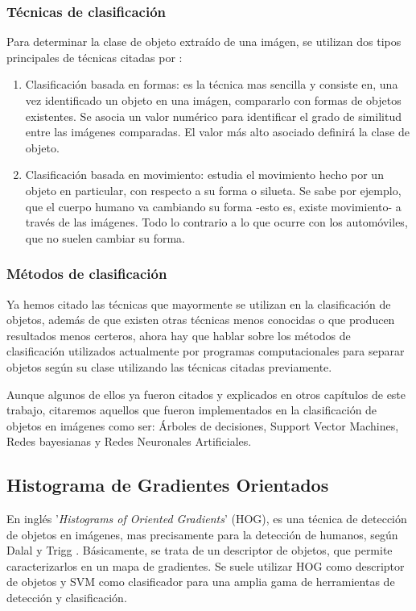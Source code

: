 \documentclass[a4paper,12pt,oneside,spanish]{book}
\begin{document}
\subsubsection{Técnicas de clasificación}
Para determinar la clase de objeto extraído de una imágen, se utilizan dos tipos principales de técnicas citadas por \cite{lozano}:
\begin{enumerate}
	\baselineskip 16pt
	\item Clasificación basada en formas: es la técnica mas sencilla y consiste en, una vez identificado un objeto en una imágen, compararlo con formas de objetos existentes. Se asocia un valor numérico para identificar el grado de similitud entre las imágenes comparadas. El valor más alto asociado definirá la clase de objeto.\\
	\item Clasificación basada en movimiento: estudia el movimiento hecho por un objeto en particular, con respecto a su forma o silueta. Se sabe por ejemplo, que el cuerpo humano va cambiando su forma -esto es, existe movimiento- a través de las imágenes. Todo lo contrario a lo que ocurre con los automóviles, que no suelen cambiar su forma.
\end{enumerate}	\baselineskip 16pt

\subsubsection{Métodos de clasificación}
Ya hemos citado las técnicas que mayormente se utilizan en la clasificación de objetos, además de que existen otras técnicas menos conocidas o que producen resultados menos certeros, ahora hay que hablar sobre los métodos de clasificación utilizados actualmente por programas computacionales para separar objetos según su clase utilizando las técnicas citadas previamente.\par

Aunque algunos de ellos ya fueron citados y explicados en otros capítulos de este trabajo, citaremos aquellos que fueron implementados en la clasificación de objetos en imágenes como ser: Árboles de decisiones, Support Vector Machines, Redes bayesianas y Redes Neuronales Artificiales.\par

\subsection{Histograma de Gradientes Orientados}
En inglés '\textit{Histograms of Oriented Gradients}' (HOG), es una técnica de detección de objetos en imágenes, mas precisamente para la detección de humanos, según Dalal y Trigg \cite{hog1}. Básicamente, se trata de un descriptor de objetos, que permite caracterizarlos en un mapa de gradientes. Se suele utilizar HOG como descriptor de objetos y SVM como clasificador para una amplia gama de herramientas de detección y clasificación.\par
\end{document}
